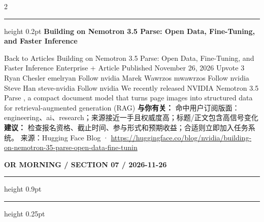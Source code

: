 \documentclass[10.5pt]{ctexart}
\begin{document}
\begin{multicols}{2}
\hrule height 0.2pt
\vspace{2mm}
{\large\bfseries Building on Nemotron 3.5 Parse: Open Data, Fine-Tuning, and Faster Inference}\par
Back to Articles Building on Nemotron 3.5 Parse: Open Data, Fine-Tuning, and Faster Inference Enterprise + Article Published November 26, 2026 Upvote 3 Ryan Chesler emelryan Follow nvidia Marek Wawrzos mwawrzos Follow nvidia Steve Han steve-nvidia Follow nvidia We recently released NVIDIA Nemotron 3.5 Parse , a compact document model that turns page images into structured data for retrieval-augmented generation (RAG)
\textbf{与你有关：} 命中用户订阅版面：engineering、ai、research；来源接近一手且权威度高；标题/正文包含高信号变化
\textbf{建议：} 检查报名资格、截止时间、参与形式和预期收益；合适则立即加入任务系统。
{\footnotesize\color{ormuted} 来源：Hugging Face Blog · \url{https://huggingface.co/blog/nvidia/building-on-nemotron-35-parse-open-data-fine-tunin}}
\end{multicols}
\newpage
{\small\bfseries OR MORNING / SECTION 07 / 2026-11-26}
\vspace{2mm}
\hrule height 0.9pt
\vspace{1.5mm}
\hrule height 0.25pt
\vspace{4mm}
\end{document}
